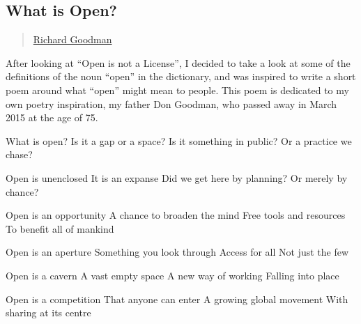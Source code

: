 \subsection{What is Open?}\label{what-is-open}

\begin{quote}
\hyperlink{richard-goodman}{Richard Goodman}
\end{quote}

After looking at ``Open is not a License'', I decided to take a look at
some of the definitions of the noun ``open'' in the dictionary, and was
inspired to write a short poem around what ``open'' might mean to
people. This poem is dedicated to my own poetry inspiration, my father
Don Goodman, who passed away in March 2015 at the age of 75.

What is open? Is it a gap or a space? Is it something in public? Or a
practice we chase?

Open is unenclosed It is an expanse Did we get here by planning? Or
merely by chance?

Open is an opportunity A chance to broaden the mind Free tools and
resources To benefit all of mankind

Open is an aperture Something you look through Access for all Not just
the few

Open is a cavern A vast empty space A new way of working Falling into
place

Open is a competition That anyone can enter A growing global movement
With sharing at its centre
